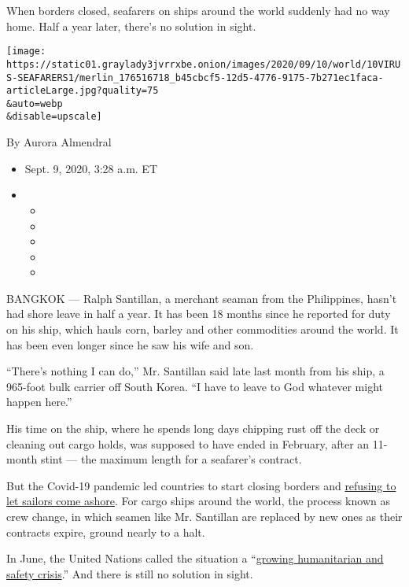 When borders closed, seafarers on ships around the world suddenly had no
way home. Half a year later, there's no solution in sight.

\texttt{[image: https://static01.graylady3jvrrxbe.onion/images/2020/09/10/world/10VIRUS-SEAFARERS1/merlin\_176516718\_b45cbcf5-12d5-4776-9175-7b271ec1faca-articleLarge.jpg?quality=75\\\&auto=webp\\\&disable=upscale]}

By Aurora Almendral

\begin{itemize}
\item
  Sept. 9, 2020, 3:28 a.m. ET
\item
  \begin{itemize}
  \item
  \item
  \item
  \item
  \item
  \end{itemize}
\end{itemize}

BANGKOK --- Ralph Santillan, a merchant seaman from the Philippines,
hasn't had shore leave in half a year. It has been 18 months since he
reported for duty on his ship, which hauls corn, barley and other
commodities around the world. It has been even longer since he saw his
wife and son.

``There's nothing I can do,'' Mr. Santillan said late last month from
his ship, a 965-foot bulk carrier off South Korea. ``I have to leave to
God whatever might happen here.''

His time on the ship, where he spends long days chipping rust off the
deck or cleaning out cargo holds, was supposed to have ended in
February, after an 11-month stint --- the maximum length for a
seafarer's contract.

But the Covid-19 pandemic led countries to start closing borders and
\href{https://www.nytimes3xbfgragh.onion/2020/03/25/world/europe/coronavirus-ship-crews-trapped.html}{refusing
to let sailors come ashore}. For cargo ships around the world, the
process known as crew change, in which seamen like Mr. Santillan are
replaced by new ones as their contracts expire, ground nearly to a halt.

In June, the United Nations called the situation a
``\href{https://www.un.org/sg/en/content/sg/statement/2020-06-12/statement-attributable-the-spokesman-for-the-secretary-general-the-repatriation-of-seafarers}{growing
humanitarian and safety crisis}.'' And there is still no solution in
sight.

